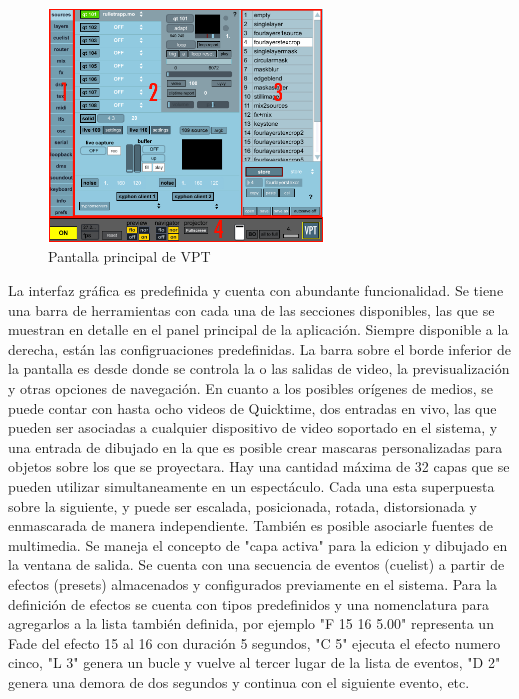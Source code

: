 \begin{figure}[H]
  \centering
    \includegraphics[width=0.65\textwidth]{./Cap3_aplicaciones/apps-vpt.png}
  \caption{Pantalla principal de VPT}
  \label{fig:Apps-VPT}
\end{figure}

La interfaz gráfica es predefinida y cuenta con abundante funcionalidad. Se tiene una barra de herramientas con cada una de las secciones disponibles, las que se muestran en detalle en el panel principal de la aplicación. Siempre disponible a la derecha, están las configruaciones predefinidas. La barra sobre el borde inferior de la pantalla es desde donde se controla la o las salidas de video, la previsualización y otras opciones de navegación.
En cuanto a los posibles orígenes de medios, se puede contar con hasta ocho videos de Quicktime, dos entradas en vivo, las que pueden ser asociadas a cualquier dispositivo de video soportado en el sistema, y una entrada de dibujado en la que es posible crear mascaras personalizadas para objetos sobre los que se proyectara.
Hay una cantidad máxima de 32 capas que se pueden utilizar simultaneamente en un espectáculo. Cada una esta superpuesta sobre la siguiente, y puede ser escalada, posicionada, rotada, distorsionada y enmascarada de manera independiente. También es posible asociarle fuentes de multimedia. Se maneja el concepto de "capa activa" para la edicion y dibujado en la ventana de salida.
Se cuenta con una secuencia de eventos (cuelist) a partir de efectos (presets) almacenados y configurados previamente en el sistema. Para la definición de efectos se cuenta con tipos predefinidos y una nomenclatura para agregarlos a la lista también definida, por ejemplo "F 15 16 5.00" representa un Fade del efecto 15 al 16 con duración 5 segundos, "C 5" ejecuta el efecto numero cinco, "L 3" genera un bucle y vuelve al tercer lugar de la lista de eventos, "D 2" genera una demora de dos segundos y continua con el siguiente evento, etc.

